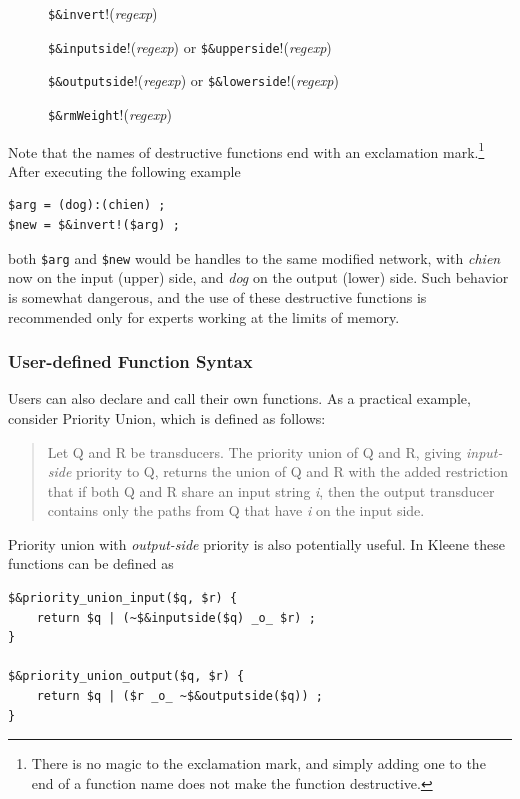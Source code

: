 \documentclass[letterpaper,12pt]{article}
\newcommand{\Kleene}{Kleene\xspace}
\begin{document}
\begin{description}
\item[]
\verb!$&invert!!(\emph{regexp})
\item[]
\verb!$&inputside!!(\emph{regexp}) or \verb!$&upperside!!(\emph{regexp}) 
\item[]
\verb!$&outputside!!(\emph{regexp}) or \verb!$&lowerside!!(\emph{regexp}) 
\item[]
\verb!$&rmWeight!!(\emph{regexp})
\end{description}

\noindent
Note that the names of destructive functions end with an
exclamation mark.\footnote{There is no magic to the exclamation mark,
and simply adding one to the end of a function name does not make the function
destructive.}  After executing the following example

\begin{Verbatim}[fontsize=\small]
$arg = (dog):(chien) ;
$new = $&invert!($arg) ;
\end{Verbatim}

\noindent
both \verb!$arg! and \verb!$new! would be handles to the same
modified network, with \emph{chien} now on the input (upper) side, and \emph{dog} on
the output (lower) side.  Such behavior is somewhat dangerous, and the use of these
destructive functions is recommended only for experts working at the limits
of memory.

\subsubsection{User-defined Function Syntax}

Users can also declare and call their own functions.  As a practical
example, consider Priority Union, which is defined as follows:

\begin{quotation}
Let Q and R be transducers.  The priority union of Q and
R, giving \emph{input-side} priority to Q, returns the union of Q and R
with the added 
restriction that if both Q and R share an input string \emph{i}, then
the output transducer contains only the paths from Q that have
\emph{i} on the
input side.
\end{quotation}

\noindent
Priority union with \emph{output-side} priority is also potentially useful.
In \Kleene{} these functions can be defined as

\begin{Verbatim}[fontsize=\small]
$&priority_union_input($q, $r) {
	return $q | (~$&inputside($q) _o_ $r) ;
}

$&priority_union_output($q, $r) {
	return $q | ($r _o_ ~$&outputside($q)) ;
}
\end{Verbatim}
\end{document}
